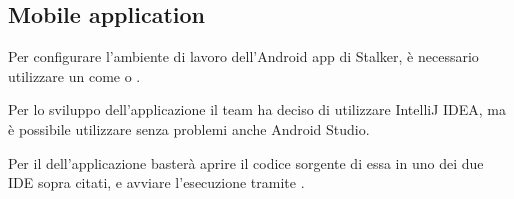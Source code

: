 \documentclass[../manuale-sviluppatore.tex]{subfiles}
\begin{document}
\subsection{Mobile application}%
\label{sub:mobile_application}

Per configurare l'ambiente di lavoro dell'Android app di Stalker, è necessario utilizzare un  come  o .

Per lo sviluppo dell'applicazione il team ha deciso di utilizzare IntelliJ IDEA, ma è possibile utilizzare senza problemi anche Android Studio.

Per il  dell'applicazione basterà aprire il codice sorgente di essa in uno dei due IDE sopra citati, e avviare l'esecuzione tramite .
\end{document}
